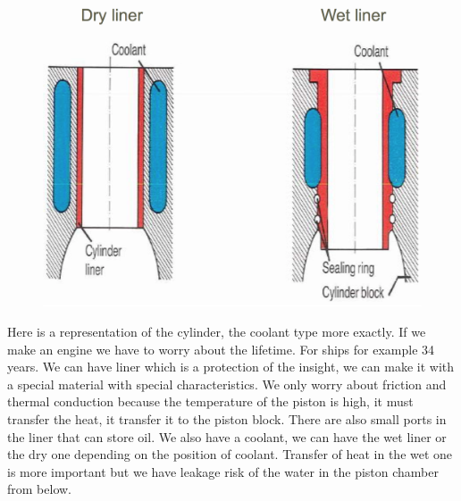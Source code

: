 			\begin{figure}
			\vspace{-5mm}
			\includegraphics[scale=0.25]{ch1/12}
			\end{figure}
			Here is a representation of the cylinder, the coolant type more exactly. If we make an engine we have to worry about the lifetime. For ships for example 34 years. We can have liner which is a protection of the insight, we can make it with a special material with special characteristics. We only worry about friction and thermal conduction because the temperature of the piston is high, it must transfer the heat, it transfer it to the piston block. There are also small ports in the liner that can store oil. We also have a coolant, we can have the wet liner or the dry one depending on the position of coolant. Transfer of heat in the wet one is more important but we have leakage risk of the water in the piston chamber from below.  

